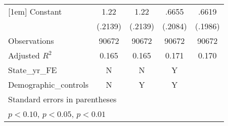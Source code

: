 \begin{table}[htbp]
\begin{tabular}{l*{4}{c}}
[1em]
Constant            &        1.22\sym{***}&        1.22\sym{***}&       .6655\sym{***}&       .6619\sym{***}\\
                    &     (.2139)         &     (.2139)         &     (.2084)         &     (.1986)         \\
\hline
Observations        &       90672         &       90672         &       90672         &       90672         \\
Adjusted \(R^{2}\)  &       0.165         &       0.165         &       0.171         &       0.170         \\
State\_yr\_FE         &           N         &           N         &           Y         &                     \\
Demographic\_controls&           N         &           Y         &           Y         &                     \\
\hline\hline
\multicolumn{5}{l}{\footnotesize Standard errors in parentheses}\\
\multicolumn{5}{l}{\footnotesize \sym{*} \(p<0.10\), \sym{**} \(p<0.05\), \sym{***} \(p<0.01\)}\\
\end{tabular}
\end{table}
